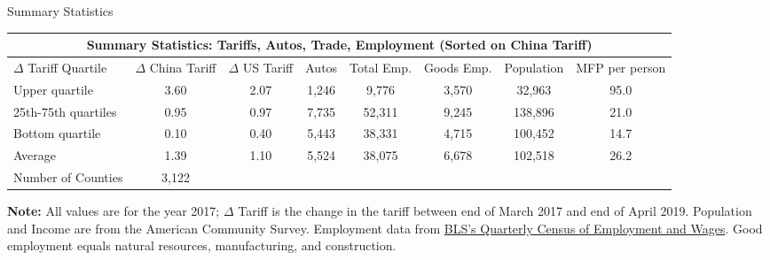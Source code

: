 \documentclass[9pt,pdftex,aspectratio=1610]{beamer}
\theoremstyle{definition}
\begin{document}
\begin{frame}[t]{Summary Statistics}
\footnotesize
\vspace{-.5cm}
\begin{table}[t]
\setlength {\tabcolsep}{1.75mm}
\renewcommand{\arraystretch}{2.25}
\begin{center}
\begin{tabular}{l c c c c c c c}
\multicolumn{8}{c}{\small \textbf{Summary Statistics: Tariffs, Autos, Trade, Employment (Sorted on China Tariff)}}\\
\hline
\hline
\footnotesize  $\Delta$ Tariff Quartile
& \footnotesize  $\Delta$ China Tariff
& \footnotesize  $\Delta$ US Tariff
& \footnotesize Autos
& \footnotesize Total Emp.
& \footnotesize Goods Emp.
& \footnotesize Population
& \footnotesize MFP per person \\
\hline
\footnotesize  Upper quartile       & 3.60  & 2.07  & 1,246  & 9,776 & 3,570 & 32,963  & 95.0 \\
\footnotesize  25th-75th quartiles  & 0.95  &0.97   & 7,735  & 52,311 & 9,245 & 138,896 & 21.0 \\
\footnotesize  Bottom quartile      & 0.10  &0.40   & 5,443  & 38,331 & 4,715 & 100,452  & 14.7 \\
\hline
\footnotesize Average               & 1.39  & 1.10  & 5,524  & 38,075 & 6,678 & 102,518 & 26.2 \\
\footnotesize Number of Counties &  3,122 \\
\hline
\end{tabular}
\parbox[c]{5.5in}{\vspace{.1cm}
{\footnotesize \textbf{Note:} All values are for the year 2017; $\Delta$ Tariff is the change in the tariff between end of March 2017 and end of April 2019. Population and Income are from the American Community Survey.
Employment data from \href{https://www.bls.gov/cew/}{BLS's Quarterly Census of Employment and Wages}. Good employment equals natural resources, manufacturing, and construction.}}
\end{center}
\end{table}

\end{frame}

\end{document}
